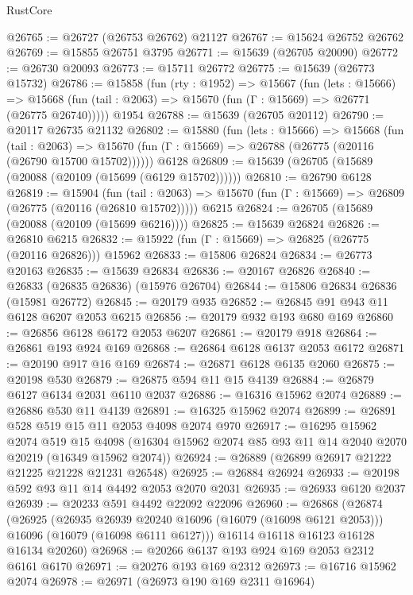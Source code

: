 \begin{lexlean}{RustCore}
\begin{coremodule}
@26765 := @26727 (@26753 @26762) @21127
@26767 := @15624 @26752 @26762
@26769 := @15855 @26751 @3795
@26771 := @15639 (@26705 @20090)
@26772 := @26730 @20093
@26773 := @15711 @26772
@26775 := @15639 (@26773 @15732)
@26786 := @15858
    (fun (rty : @1952) =>
    @15667
      (fun (lets : @15666) =>
      @15668 (fun (tail : @2063) => @15670 (fun (Γ : @15669) => @26771 (@26775 @26740)))))
    @1954
@26788 := @15639 (@26705 @20112)
@26790 := @20117 @26735 @21132
@26802 := @15880
    (fun (lets : @15666) =>
    @15668
      (fun (tail : @2063) =>
      @15670 (fun (Γ : @15669) => @26788 (@26775 (@20116 (@26790 @15700 @15702))))))
    @6128
@26809 := @15639 (@26705 (@15689 (@20088 (@20109 (@15699 (@6129 @15702))))))
@26810 := @26790 @6128
@26819 := @15904
    (fun (tail : @2063) => @15670 (fun (Γ : @15669) => @26809 (@26775 (@20116 (@26810 @15702)))))
    @6215
@26824 := @26705 (@15689 (@20088 (@20109 (@15699 @6216))))
@26825 := @15639 @26824
@26826 := @26810 @6215
@26832 := @15922 (fun (Γ : @15669) => @26825 (@26775 (@20116 @26826))) @15962
@26833 := @15806 @26824
@26834 := @26773 @20163
@26835 := @15639 @26834
@26836 := @20167 @26826
@26840 := @26833 (@26835 @26836) (@15976 @26704)
@26844 := @15806 @26834 @26836 (@15981 @26772)
@26845 := @20179 @935
@26852 := @26845 @91 @943 @11 @6128 @6207 @2053 @6215
@26856 := @20179 @932 @193 @680 @169
@26860 := @26856 @6128 @6172 @2053 @6207
@26861 := @20179 @918
@26864 := @26861 @193 @924 @169
@26868 := @26864 @6128 @6137 @2053 @6172
@26871 := @20190 @917 @16 @169
@26874 := @26871 @6128 @6135 @2060
@26875 := @20198 @530
@26879 := @26875 @594 @11 @15 @4139
@26884 := @26879 @6127 @6134 @2031 @6110 @2037
@26886 := @16316 @15962 @2074
@26889 := @26886 @530 @11 @4139
@26891 := @16325 @15962 @2074
@26899 := @26891 @528 @519 @15 @11 @2053 @4098 @2074 @970
@26917 := @16295
    @15962
    @2074
    @519
    @15
    @4098
    (@16304 @15962 @2074 @85 @93 @11 @14 @2040 @2070 @20219 (@16349 @15962 @2074))
@26924 := @26889 (@26899 @26917 @21222 @21225 @21228 @21231 @26548)
@26925 := @26884 @26924
@26933 := @20198 @592 @93 @11 @14 @4492 @2053 @2070 @2031
@26935 := @26933 @6120 @2037
@26939 := @20233 @591 @4492 @22092 @22096
@26960 := @26868
    (@26874
      (@26925
        (@26935 @26939 @20240 @16096 (@16079 (@16098 @6121 @2053)))
        @16096
        (@16079 (@16098 @6111 @6127)))
      @16114
      @16118
      @16123
      @16128
      @16134
      @20260)
@26968 := @20266 @6137 @193 @924 @169 @2053 @2312 @6161 @6170
@26971 := @20276 @193 @169 @2312
@26973 := @16716 @15962 @2074
@26978 := @26971 (@26973 @190 @169 @2311 @16964)

\end{coremodule}
\end{lexlean}
